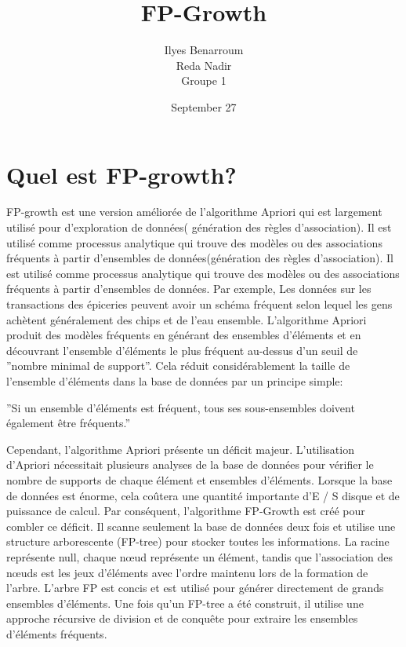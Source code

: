 \documentclass[a4paper,12pt]{article}
\author{Ilyes Benarroum \\
Reda Nadir \\
Groupe 1
}
\title{FP-Growth}
\date{September 27}
\begin{document}
\maketitle
\section{Quel est FP-growth?}
FP-growth est une version améliorée de l'algorithme Apriori qui est largement utilisé pour d'exploration de données( génération des règles d'association). Il est utilisé comme processus analytique qui trouve des modèles ou des associations fréquents à partir d'ensembles de données(génération des règles d'association).
Il est utilisé comme processus analytique qui trouve des modèles ou des associations fréquents à partir d'ensembles de données.
Par exemple, Les données sur les transactions des épiceries peuvent avoir un schéma fréquent selon lequel les gens achètent généralement des chips et de l'eau ensemble.
L'algorithme Apriori produit des modèles fréquents en générant des ensembles d'éléments et en découvrant l'ensemble d'éléments le plus fréquent au-dessus d'un seuil de ''nombre minimal de support''.
Cela réduit considérablement la taille de l'ensemble d'éléments dans la base de données par un principe simple:

''Si un ensemble d'éléments est fréquent, tous ses sous-ensembles doivent également être fréquents.''

Cependant, l'algorithme Apriori présente un déficit majeur. L'utilisation d'Apriori nécessitait plusieurs analyses de la base de données pour vérifier le nombre de supports de chaque élément et ensembles d'éléments.
Lorsque la base de données est énorme, cela coûtera une quantité importante d'E / S disque et de puissance de calcul. Par conséquent, l'algorithme FP-Growth est créé pour combler ce déficit. Il scanne seulement la base de données deux fois et utilise une structure arborescente (FP-tree) pour stocker toutes les informations.
La racine représente null, chaque nœud représente un élément, tandis que l'association des nœuds est les jeux d'éléments avec l'ordre maintenu lors de la formation de l'arbre. L'arbre FP est concis et est utilisé pour générer directement de grands ensembles d'éléments. Une fois qu'un FP-tree a été construit, il utilise une approche récursive de division et de conquête pour extraire les ensembles d'éléments fréquents.
\end{document}
